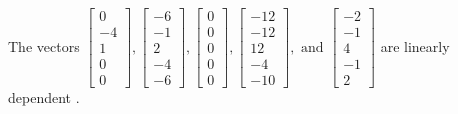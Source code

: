 \begin{exercise}
\begin{exerciseStatement}
  \end{exerciseStatement}
  \begin{exerciseAnswer}
   The vectors \(\left[\begin{array}{r}
0 \\
-4 \\
1 \\
0 \\
0
\end{array}\right] , \left[\begin{array}{r}
-6 \\
-1 \\
2 \\
-4 \\
-6
\end{array}\right] , \left[\begin{array}{r}
0 \\
0 \\
0 \\
0 \\
0
\end{array}\right] , \left[\begin{array}{r}
-12 \\
-12 \\
12 \\
-4 \\
-10
\end{array}\right] , \text{ and } \left[\begin{array}{r}
-2 \\
-1 \\
4 \\
-1 \\
2
\end{array}\right]\) are 
  	 linearly dependent  .
  


  \end{exerciseAnswer}
\end{exercise}